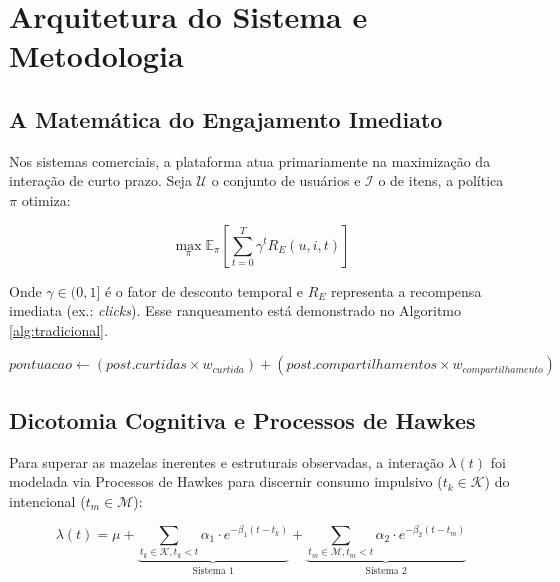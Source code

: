 \section{Arquitetura do Sistema e Metodologia} \label{sec:method}

\subsection{A Matemática do Engajamento Imediato}
Nos sistemas comerciais, a plataforma atua primariamente na maximização da interação de curto prazo. Seja $\mathcal{U}$ o conjunto de usuários e $\mathcal{I}$ o de itens, a política $\pi$ otimiza:

\begin{equation} \label{eq:engajamento}
    \max_{\pi} \mathbb{E}_{\pi} \left[ \sum_{t=0}^{T} \gamma^t R_E(u, i, t) \right]
\end{equation}

Onde $\gamma \in (0,1]$ é o fator de desconto temporal e $R_E$ representa a recompensa imediata (ex.: \textit{clicks}). Esse ranqueamento está demonstrado no Algoritmo \ref{alg:tradicional}.

\begin{algorithm}[h]
\caption{Lógica Tradicional de Ranqueamento de Feed}
\label{alg:tradicional}
$pontuacao \gets (post.curtidas \times w_{curtida}) + (post.compartilhamentos \times w_{compartilhamento})$\;
\;
\end{algorithm}

\subsection{Dicotomia Cognitiva e Processos de Hawkes}
Para superar as mazelas inerentes e estruturais observadas, a interação $\lambda(t)$ foi modelada via Processos de Hawkes para discernir consumo impulsivo ($t_k \in \mathcal{K}$) do intencional ($t_m \in \mathcal{M}$):

\begin{equation} \label{eq:hawkes}
    \lambda(t) = \mu + \underbrace{\sum_{t_k \in \mathcal{K}, t_k < t} \alpha_1 \cdot e^{-\beta_1(t-t_k)}}_{\text{Sistema 1}} + \underbrace{\sum_{t_m \in \mathcal{M}, t_m < t} \alpha_2 \cdot e^{-\beta_2(t-t_m)}}_{\text{Sistema 2}}
\end{equation}

